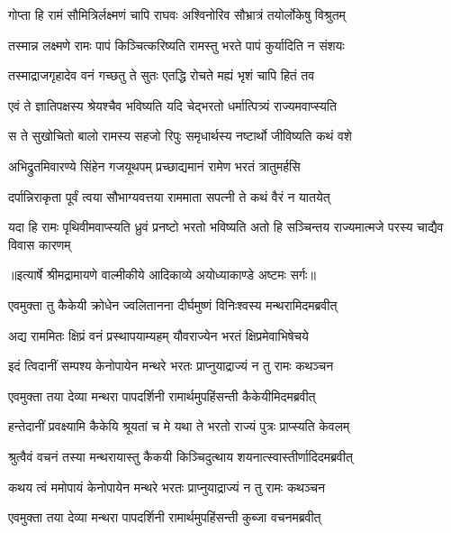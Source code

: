 \twolineshloka
{गोप्ता हि रामं सौमित्रिर्लक्ष्मणं चापि राघवः}
{अश्विनोरिव सौभ्रात्रं तयोर्लोकेषु विश्रुतम्} %

\twolineshloka
{तस्मान्न लक्ष्मणे रामः पापं किञ्चित्करिष्यति}
{रामस्तु भरते पापं कुर्यादिति न संशयः} %

\twolineshloka
{तस्माद्राजगृहादेव वनं गच्छतु ते सुतः}
{एतद्धि रोचते मह्यं भृशं चापि हितं तव} %

\twolineshloka
{एवं ते ज्ञातिपक्षस्य श्रेयश्चैव भविष्यति}
{यदि चेद्भरतो धर्मात्पित्र्यं राज्यमवाप्स्यति} %

\twolineshloka
{स ते सुखोचितो बालो रामस्य सहजो रिपुः}
{समृधार्थस्य नष्टार्थो जीविष्यति कथं वशे} %

\twolineshloka
{अभिद्रुतमिवारण्ये सिंहेन गजयूथपम्}
{प्रच्छाद्यमानं रामेण भरतं त्रातुमर्हसि} %

\twolineshloka
{दर्पान्निराकृता पूर्वं त्वया सौभाग्यवत्तया}
{राममाता सपत्नी ते कथं वैरं न यातयेत्} %

\fourlineindentedshloka
{यदा हि रामः पृथिवीमवाप्स्यति}
{ध्रुवं प्रनष्टो भरतो भविष्यति}
{अतो हि सञ्चिन्तय राज्यमात्मजे}
{परस्य चाद्यैव विवास कारणम्} %


{॥इत्यार्षे श्रीमद्रामायणे वाल्मीकीये आदिकाव्ये अयोध्याकाण्डे अष्टमः सर्गः॥}


\twolineshloka
{एवमुक्ता तु कैकेयी क्रोधेन ज्वलितानना}
{दीर्घमुष्णं विनिःश्वस्य मन्थरामिदमब्रवीत्} %

\twolineshloka
{अद्य राममितः क्षिप्रं वनं प्रस्थापयाम्यहम्}
{यौवराज्येन भरतं क्षिप्रमेवाभिषेचये} %

\twolineshloka
{इदं त्विदानीं सम्पश्य केनोपायेन मन्थरे}
{भरतः प्राप्नुयाद्राज्यं न तु रामः कथञ्चन} %

\twolineshloka
{एवमुक्ता तया देव्या मन्थरा पापदर्शिनी}
{रामार्थमुपहिंसन्ती कैकेयीमिदमब्रवीत्} %

\twolineshloka
{हन्तेदानीं प्रवक्ष्यामि कैकेयि श्रूयतां च मे}
{यथा ते भरतो राज्यं पुत्रः प्राप्स्यति केवलम्} %

\twolineshloka
{श्रुत्वैवं वचनं तस्या मन्थरायास्तु कैकयी}
{किञ्चिदुत्थाय शयनात्स्वास्तीर्णादिदमब्रवीत्} %

\twolineshloka
{कथय त्वं ममोपायं केनोपायेन मन्थरे}
{भरतः प्राप्नुयाद्राज्यं न तु रामः कथञ्चन} %

\twolineshloka
{एवमुक्ता तया देव्या मन्थरा पापदर्शिनी}
{रामार्थमुपहिंसन्ती कुब्जा वचनमब्रवीत्} %

